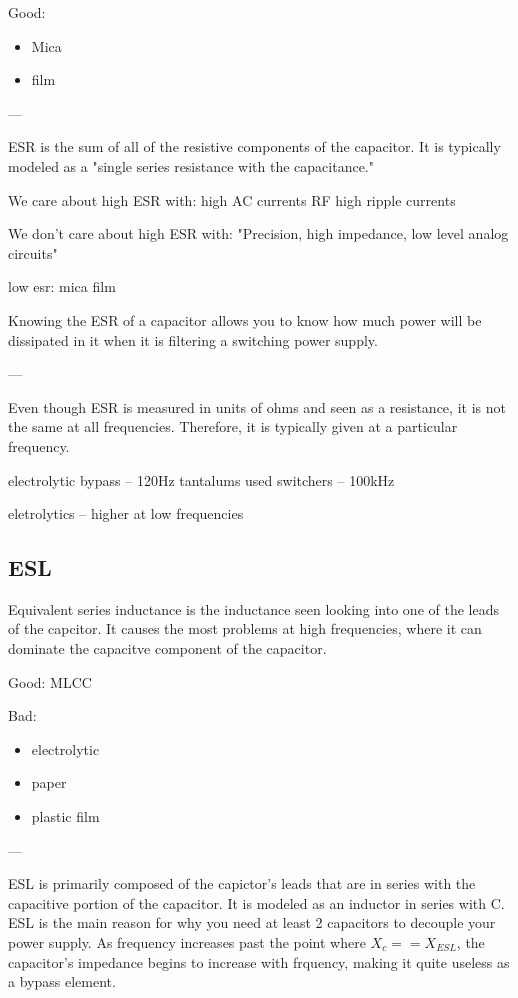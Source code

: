 Good:
\begin{itemize}
    \item Mica
    \item film
    \cite{anal_capProps}
\end{itemize}

---

ESR is the sum of all of the resistive components of the capacitor. It is typically modeled as a "single series resistance with the capacitance."

We care about high ESR with:
high AC currents
RF
high ripple currents

We don't care about high ESR with:
"Precision, high impedance, low level analog circuits"
\cite[Sect.~3.6.7]{elec_inv}

low esr:
mica
film

Knowing the ESR of a capacitor allows you to know how much power will be dissipated in it when it is filtering a switching power supply.\cite[Sect.~3.6.7]{elec_inv}

---

Even though ESR is measured in units of ohms and seen as a resistance, it is not the same at all frequencies. Therefore, it is typically given at a particular frequency.

electrolytic bypass -- 120Hz
tantalums used switchers -- 100kHz

eletrolytics -- higher at low frequencies
\cite{capSite_intro}

\subsection{ESL}

Equivalent series inductance is the inductance seen looking into one of the leads of the capcitor. It causes the most problems at high frequencies, where it can dominate the capacitve component of the capacitor. 
\cite{anal_capProps}

Good:
MLCC

Bad:
\begin{itemize}
    \item electrolytic
    \item paper
    \item plastic film\cite{anal_capProps}
\end{itemize}

---

ESL is primarily composed of the capictor's leads that are in series with the capacitive portion of the capacitor. It is modeled as an inductor in series with C. ESL is the main reason for why you need at least 2 capacitors to decouple your power supply. As frequency increases past the point where $X_c == X_{ESL}$, the capacitor's impedance begins to increase with frquency, making it quite useless as a bypass element. 

